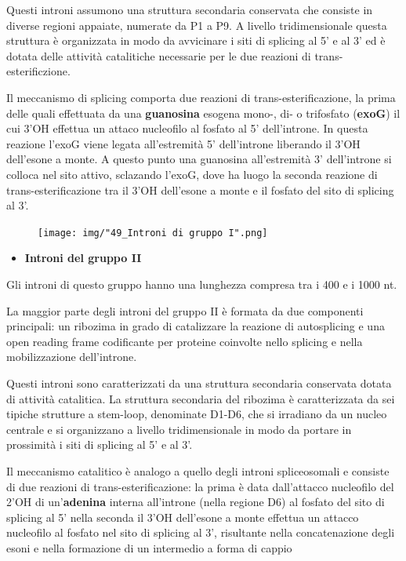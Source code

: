 \documentclass[11pt]{book}
\begin{document}
Questi introni assumono una struttura secondaria conservata che consiste
in diverse regioni appaiate, numerate da P1 a P9. A livello
tridimensionale questa struttura è organizzata in modo da avvicinare i
siti di splicing al 5' e al 3' ed è dotata delle attività catalitiche
necessarie per le due reazioni di trans-esterificzione.

Il meccanismo di splicing comporta due reazioni di
trans-esterificazione, la prima delle quali effettuata da una
\textbf{guanosina} esogena mono-, di- o trifosfato (\textbf{exoG}) il
cui 3'OH effettua un attaco nucleofilo al fosfato al 5' dell'introne. In
questa reazione l'exoG viene legata all'estremità 5' dell'introne
liberando il 3'OH dell'esone a monte. A questo punto una guanosina
all'estremità 3' dell'introne si colloca nel sito attivo, sclazando
l'exoG, dove ha luogo la seconda reazione di trans-esterificazione tra
il 3'OH dell'esone a monte e il fosfato del sito di splicing al 3'.

\begin{figure}[htp]
\centering
\texttt{[image: img/"49\_Introni di gruppo I".png]}
\caption{}
\label{introni-di-gruppo-i}
\end{figure}

\begin{itemize}
\itemsep1pt\parskip0pt
\item
  \textbf{Introni del gruppo II}
\end{itemize}

Gli introni di questo gruppo hanno una lunghezza compresa tra i 400 e i
1000 nt.

La maggior parte degli introni del gruppo II è formata da due componenti
principali: un ribozima in grado di catalizzare la reazione di
autosplicing e una open reading frame codificante per proteine coinvolte
nello splicing e nella mobilizzazione dell'introne.

Questi introni sono caratterizzati da una struttura secondaria
conservata dotata di attività catalitica. La struttura secondaria del
ribozima è caratterizzata da sei tipiche strutture a stem-loop,
denominate D1-D6, che si irradiano da un nucleo centrale e si
organizzano a livello tridimensionale in modo da portare in prossimità i
siti di splicing al 5' e al 3'.

Il meccanismo catalitico è analogo a quello degli introni spliceosomali
e consiste di due reazioni di trans-esterificazione: la prima è data
dall'attacco nucleofilo del 2'OH di un'\textbf{adenina} interna
all'introne (nella regione D6) al fosfato del sito di splicing al 5'
nella seconda il 3'OH dell'esone a monte effettua un attacco nucleofilo
al fosfato nel sito di splicing al 3', risultante nella concatenazione
degli esoni e nella formazione di un intermedio a forma di cappio
\end{document}
